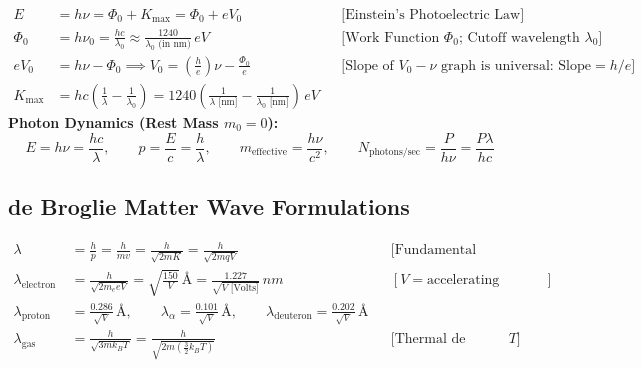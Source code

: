 \documentclass[11pt,a4paper]{article}
\begin{document}
\begin{formulabox}
\begin{align}
  E &= h\nu = \Phi_0 + K_{\max} = \Phi_0 + e V_0 && \text{[Einstein's Photoelectric Law]} \\
  \Phi_0 &= h\nu_0 = \frac{hc}{\lambda_0} \approx \frac{1240}{\lambda_0\text{ (in nm)}}\,\si{eV} && \text{[Work Function $\Phi_0$; Cutoff wavelength $\lambda_0$]} \\
  e V_0 &= h\nu - \Phi_0 \implies V_0 = \left(\frac{h}{e}\right)\nu - \frac{\Phi_0}{e} && \text{[Slope of $V_0-\nu$ graph is universal: $\text{Slope} = h/e$]} \\
  K_{\max} &= hc\left(\frac{1}{\lambda} - \frac{1}{\lambda_0}\right) = 1240\left(\frac{1}{\lambda\text{ [nm]}} - \frac{1}{\lambda_0\text{ [nm]}}\right)\,\si{eV}
\end{align}
\textbf{Photon Dynamics (Rest Mass $m_0 = 0$):}
\begin{equation}
  E = h\nu = \frac{hc}{\lambda}, \qquad p = \frac{E}{c} = \frac{h}{\lambda}, \qquad m_{\text{effective}} = \frac{h\nu}{c^2}, \qquad N_{\text{photons/sec}} = \frac{P}{h\nu} = \frac{P\lambda}{hc}
\end{equation}
\end{formulabox}

\subsection{de Broglie Matter Wave Formulations}

\begin{formulabox}
\begin{align}
  \lambda &= \frac{h}{p} = \frac{h}{mv} = \frac{h}{\sqrt{2mK}} = \frac{h}{\sqrt{2mqV}} && \text{[Fundamental Matter Wave Equation]} \\
  \lambda_{\text{electron}} &= \frac{h}{\sqrt{2m_e e V}} = \sqrt{\frac{150}{V}}\,\text{\AA} = \frac{1.227}{\sqrt{V\text{ [Volts]}}}\,\si{nm} && [V = \text{accelerating potential in Volts}] \\
  \lambda_{\text{proton}} &= \frac{0.286}{\sqrt{V}}\,\text{\AA}, \qquad \lambda_{\alpha} = \frac{0.101}{\sqrt{V}}\,\text{\AA}, \qquad \lambda_{\text{deuteron}} = \frac{0.202}{\sqrt{V}}\,\text{\AA} \\
  \lambda_{\text{gas molecule}} &= \frac{h}{\sqrt{3m k_B T}} = \frac{h}{\sqrt{2m\left(\frac{3}{2}k_B T\right)}} && \text{[Thermal de Broglie Wavelength at Temp } T\text{]}
\end{align}
\end{formulabox}
\end{document}
